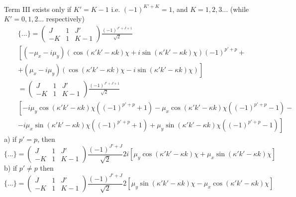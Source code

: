 Term III exists only if $K' = K -1$ i.e. $(-1)^{K'+K} = 1$, and $K = 1, 2, 3...$ (while $K' = 0, 1, 2...$ respectively)
\begin{eqnarray}  \nonumber
&& \{...\} = 
\left( \begin{array}{ccc} 
 J &  1 &  J' \\
-K &  1 & K-1  \end{array} \right)
\frac{(-1)^{J'+J+1}}{\sqrt{2}} \\ \nonumber
&&
\left[ ( -\mu_x - i \mu_y) 
\left( \cos ( \kappa' k' - \kappa k) \chi + i \sin ( \kappa' k' - \kappa k) \chi \right) (-1)^{p'+p} + \right. \\
&& \left.
+ ( \mu_x - i \mu_y)
\left( \cos ( \kappa' k' - \kappa k) \chi - i \sin ( \kappa' k' - \kappa k) \chi \right) \right] \\ \nonumber
&& = 
\left( \begin{array}{ccc} 
 J &  1 &  J' \\
-K &  1 & K-1  \end{array} \right)
\frac{(-1)^{J'+J+1}}{\sqrt{2}} \\ \nonumber
&& \left[ 
-i \mu_y \cos ( \kappa' k' - \kappa k) \chi \left( (-1)^{p'+p} + 1 \right)
-  \mu_x \cos ( \kappa' k' - \kappa k) \chi \left( (-1)^{p'+p} - 1 \right) - \right. \\
&& \left.
-i \mu_x \sin ( \kappa' k' - \kappa k) \chi \left( (-1)^{p'+p} + 1 \right)
+  \mu_y \sin ( \kappa' k' - \kappa k) \chi \left( (-1)^{p'+p} - 1 \right) \right]
\end{eqnarray}
a) if $p' = p$, then 
\begin{equation}
\{...\} = 
\left( \begin{array}{ccc} 
 J &  1 &  J' \\
-K &  1 & K-1  \end{array} \right)
\frac{(-1)^{J'+J}}{\sqrt{2}} 2i \left[
\mu_y \cos ( \kappa' k' - \kappa k) \chi +  \mu_x \sin ( \kappa' k' - \kappa k) \chi \right]
\end{equation}
b) if $p' \ne p$ then
\begin{equation}
\{...\} = 
\left( \begin{array}{ccc} 
 J &  1 &  J' \\
-K &  1 & K-1  \end{array} \right)
\frac{(-1)^{J'+J}}{\sqrt{2}} 2  \left[
\mu_y \sin ( \kappa' k' - \kappa k) \chi -  \mu_x \cos ( \kappa' k' - \kappa k) \chi \right]
\end{equation}

